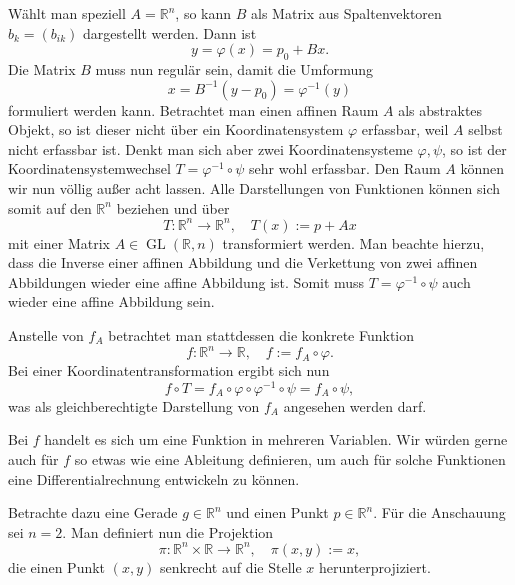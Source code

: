 \documentclass[a4paper,11pt,fleqn,twoside]{scrartcl}
\numberwithin{equation}{section}
\newcommand{\R}{\mathbb R}
\begin{document}
Wählt man speziell $A=\R^n$, so kann $B$ als Matrix aus
Spaltenvektoren $b_k=(b_{ik})$ dargestellt werden. Dann ist
\begin{equation}
y = \varphi(x) = p_0+Bx.
\end{equation}
Die Matrix $B$ muss nun regulär sein, damit die Umformung
\begin{equation}
x = B^{-1}(y-p_0) = \varphi^{-1}(y)
\end{equation}
formuliert werden kann. Betrachtet man einen affinen Raum $A$ als
abstraktes Objekt, so ist dieser nicht über ein Koordinatensystem
$\varphi$ erfassbar, weil $A$ selbst nicht erfassbar ist. Denkt
man sich aber zwei Koordinatensysteme $\varphi,\psi$, so ist
der Koordinatensystemwechsel $T=\varphi^{-1}\circ\psi$ sehr
wohl erfassbar. Den Raum $A$ können wir nun völlig außer acht lassen.
Alle Darstellungen von Funktionen können sich somit auf
den $\R^n$ beziehen und über
\begin{equation}
T\colon\R^n\to\R^n,\quad T(x) := p+Ax
\end{equation}
mit einer Matrix $A\in\operatorname{GL}(\R,n)$ transformiert werden.
Man beachte
hierzu, dass die Inverse einer affinen Abbildung und die Verkettung
von zwei affinen Abbildungen wieder eine affine Abbildung ist. Somit
muss $T=\varphi^{-1}\circ\psi$ auch wieder eine affine Abbildung
sein.

Anstelle von $f_A$ betrachtet man stattdessen
die konkrete Funktion
\begin{equation}
f\colon\R^n\to\R,\quad f := f_A\circ\varphi.
\end{equation}
Bei einer Koordinatentransformation ergibt sich nun
\begin{equation}
f\circ T = f_A\circ\varphi\circ\varphi^{-1}\circ\psi
= f_A\circ\psi,
\end{equation}
was als gleichberechtigte Darstellung von $f_A$ angesehen werden
darf.

Bei $f$ handelt es sich um eine Funktion in mehreren Variablen.
Wir würden gerne auch für $f$ so etwas wie eine Ableitung definieren,
um auch für solche Funktionen eine Differentialrechnung entwickeln
zu können.

Betrachte dazu eine Gerade $g\in\R^n$ und einen Punkt $p\in\R^n$.
Für die Anschauung sei $n=2$. Man definiert nun die Projektion
\begin{equation}
\pi\colon\R^n\times\R\to\R^n,\quad \pi(x,y):=x,
\end{equation}
die einen Punkt $(x,y)$ senkrecht auf die Stelle $x$
herunterprojiziert.
\end{document}
